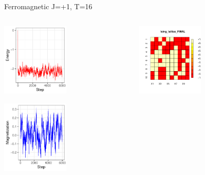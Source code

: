 \documentclass{beamer}
\begin{document}
\begin{frame}{Ferromagnetic J=+1, T=16}
\begin{columns}
\begin{column}{0.5\textwidth}
    \begin{center}
     \includegraphics[width=0.5\textwidth]{Pic/J+1_10_2500_T=16_ENERGY.pdf}
     \end{center}
         \begin{center}
     \includegraphics[width=0.5\textwidth]{Pic/J+1_10_2500_T=16_Magnetization.pdf}
     \end{center}
\end{column}
\begin{column}{0.5\textwidth}
    \begin{center}
     \includegraphics[width=0.5\textwidth]{Pic/J+1_10_2500_T=16_FINAL.pdf}

\end{center}
\end{column}
\end{columns}
\end{frame}
\end{document}
